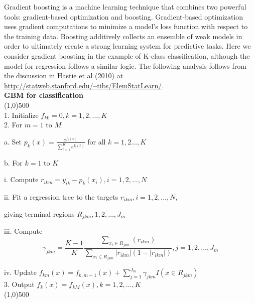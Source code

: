 {Gradient boosting is a machine learning technique that combines two powerful tools: gradient-based optimization and boosting. Gradient-based optimization uses gradient computations to minimize a model's loss function with respect to the training data. Boosting additively collects an ensemble of weak models in order to ultimately create a strong learning system for predictive tasks. Here we consider gradient boosting in the example of K-class classification, although the model for regression follows a similar logic. The following analysis follows from the discussion in Hastie et al (2010) at {\url{http://statweb.stanford.edu/~tibs/ElemStatLearn/}}.
\newline
\\
{\bf{\footnotesize{GBM for classification}}}
\\
\line(1,0){500}
\\ 
1. Initialize $f_{k0} = 0, k = 1,2,\dots,K$ 
\\
2. For $m=1$ to $M$

\hspace{1cm} a. Set $p_k(x) = \frac{e^{f_k(x)}}{\sum_{l=1}^K e^{f_l(x)}}$ for all $k = 1,2\dots, K$

\hspace{1cm} b. For $k=1$ to $K$

\hspace{2cm} i. Compute $r_{ikm} = y_{ik} - p_k(x_i),  i = 1,2,\dots,N$

\hspace{2cm} ii. Fit a regression tree to the targets $r_{ikm}, i = 1,2,\dots,N$, 
\par \hspace{2.5cm} giving terminal regions $R_{jkm}, 1,2,\dots,J_m$

\hspace{2cm}iii. Compute $$\gamma_{jkm} = \frac{K-1}{K} \frac{\sum_{x_i \in R_{jkm}} (r_{ikm})}{\sum_{x_i \in R_{jkm}} |r_{ikm}| (1 - |r_{ikm}|)} , j=1,2,\dots,J_m$$

\hspace{2cm} iv. Update $f_{km}(x) = f_{k,m-1}(x) + \sum_{j=1}^{J_m} \gamma_{jkm} I(x \in R_{jkm})$
\\
3. Output $f_k^{\hat{}}(x) = f_{kM}(x),  k=1,2,\dots,K$
\\
\line(1,0){500}

}
